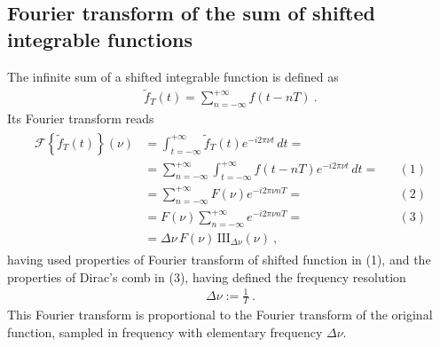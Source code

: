 \documentclass[letterpaper,10pt,english]{jupyterBook}
\begin{document}
\subsection{Fourier transform of the sum of shifted integrable functions}
\label{\detokenize{ch/complex/fourier-transforms:fourier-transform-of-the-sum-of-shifted-integrable-functions}}\label{\detokenize{ch/complex/fourier-transforms:complex-fourier-series}}
\sphinxAtStartPar
The infinite sum of a shifted integrable function is defined as
\begin{equation*}
\begin{split}\tilde{f}_T(t) = \sum_{n=-\infty}^{+\infty} f(t - nT) \ .\end{split}
\end{equation*}
\sphinxAtStartPar
Its Fourier transform reads
\begin{equation*}
\begin{split}\begin{aligned}
  \mathscr{F}\left\{ \tilde{f}_T(t) \right\}(\nu)
  & = \int_{t=-\infty}^{+\infty} \tilde{f}_T(t) e^{-i 2 \pi \nu t} \, dt = \\
  & = \sum_{n=-\infty}^{+\infty} \int_{t=-\infty}^{+\infty} f(t-nT) e^{-i 2 \pi \nu t} \, dt = && (1) \\
  & = \sum_{n=-\infty}^{+\infty} F(\nu) e^{-i 2 \pi \nu n T} = && (2) \\
  & = F(\nu) \sum_{n=-\infty}^{+\infty} e^{-i 2 \pi \nu n T} = && (3) \\
  & = \Delta \nu \, F(\nu) \, \text{III}_{\Delta \nu}(\nu) \ ,
\end{aligned}\end{split}
\end{equation*}
\sphinxAtStartPar
having used properties of Fourier transform of shifted function in (1), and the properties of Dirac’s comb in (3), having defined the frequency resolution
\begin{equation*}
\begin{split}\Delta \nu := \frac{1}{T} \ .\end{split}
\end{equation*}
\sphinxAtStartPar
This Fourier transform is proportional to the Fourier transform of the original function, sampled in frequency with elementary frequency \(\Delta \nu\).
\end{document}
